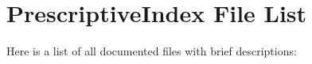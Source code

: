 \section{Prescriptive\-Index File List}
Here is a list of all documented files with brief descriptions:\begin{CompactList}
\item{}
\end{CompactList}
